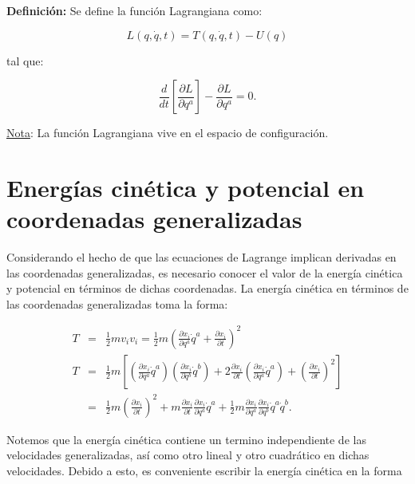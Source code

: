 \documentclass[12pt]{report}
\begin{document}
\textbf{Definición:} Se define la función Lagrangiana como:

\begin{equation}
L\left(q,\dot{q},t\right)= T\left( q,\dot{q},t \right) - U\left(q \right)
\end{equation}

tal que:

\begin{equation}
\frac{d}{dt} \left[ \frac{\partial L}{\partial q^a} \right]- \frac{\partial L}{\partial q^a} = 0.
\end{equation}


\underline{Nota}: La función Lagrangiana vive en el espacio de configuración.




\section{Energías cinética y potencial en coordenadas generalizadas}

Considerando el hecho de que las ecuaciones de Lagrange implican derivadas en las coordenadas generalizadas, es necesario conocer el valor de la energía cinética y potencial en términos de dichas coordenadas. La energía cinética en términos de las coordenadas generalizadas toma la forma:

\begin{eqnarray}
T&=&\frac{1}{2}mv_i v_i = \frac{1}{2}m \left( \frac{\partial x_i}{\partial q^a} \dot{q}^a +\frac{\partial x_i}{\partial t} \right)^2 \\
T&=&\frac{1}{2}m \left[ \left( \frac{\partial x_i}{\partial q^a}\dot{q}^a \right) \left( \frac{\partial x_i}{\partial q^b}\dot{q}^b\right) + 2\frac{\partial x_i}{\partial t} \left( \frac{\partial x_i}{\partial q^a} \dot{q}^a \right) + \left( \frac{\partial x_i}{\partial t} \right)^2 \right] \\
&=& \frac{1}{2}m\left( \frac{\partial x_i}{\partial t} \right)^2 + m\frac{\partial x_i}{\partial t}  \frac{\partial x_i}{\partial q^a} \dot{q}^a + \frac{1}{2}m  \frac{\partial x_i}{\partial q^a}  \frac{\partial x_i}{\partial q^b}\dot{q}^a\dot{q}^b .
\end{eqnarray}

Notemos que la energía cinética contiene un termino independiente de las velocidades generalizadas, así como otro lineal y otro cuadrático en dichas velocidades. Debido a esto, es conveniente escribir la energía cinética en la forma 
\end{document}

